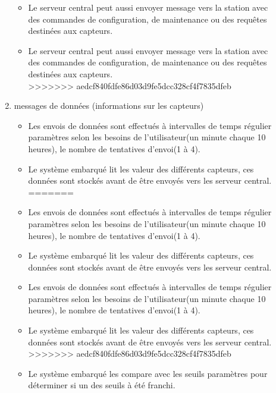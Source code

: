 \documentclass [a4paper] {report}
\begin{document}
\begin{description}
\begin{enumerate}
\begin{itemize}
		\item Le serveur central peut aussi envoyer message vers la station avec des commandes 
		de configuration, de maintenance ou des requêtes destinées aux capteurs.\\
		\item Le serveur central peut aussi envoyer message vers la station avec des commandes de configuration, de maintenance ou des requêtes destinées aux capteurs.\\

>>>>>>> aedcf840fdfe86d03d9fe5dcc328cf4f7835dfeb
		\end{itemize}
	
	\item messages de données (informations sur les capteurs)\\
		\begin{itemize}
<<<<<<< HEAD
		\item Les envois de données sont effectués à intervalles de temps régulier paramètres selon les besoins de l'utilisateur(un minute chaque 10 heures), le nombre de tentatives d'envoi(1 à 4).\\
		\item Le système embarqué lit les valeur des différents capteurs, ces données sont stockés avant de être envoyés vers les serveur central.\\
=======

		\item Les envois de données sont effectués à intervalles de temps régulier paramètres selon les
		 besoins de l'utilisateur(un minute chaque 10 heures), le nombre de tentatives d'envoi(1 à 4).\\
		\item Le système embarqué lit les valeur des différents capteurs, ces données sont stockés avant 
		de être envoyés vers les serveur central.\\

		\item Les envois de données sont effectués à intervalles de temps régulier paramètres selon les besoins de l'utilisateur(un minute chaque 10 heures), le nombre de tentatives d'envoi(1 à 4).\\
		\item Le système embarqué lit les valeur des différents capteurs, ces données sont stockés avant de être envoyés vers les serveur central.\\

>>>>>>> aedcf840fdfe86d03d9fe5dcc328cf4f7835dfeb
		\item Le système embarqué les compare avec les seuils paramètres pour déterminer si un des seuils à été franchi. \\
		\end{itemize}


\end{enumerate}
\end{description}
\end{document}
